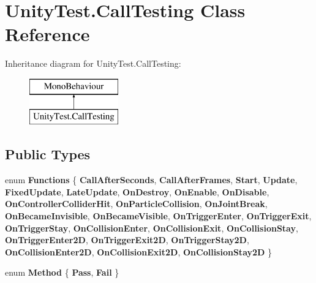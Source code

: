 \hypertarget{class_unity_test_1_1_call_testing}{}\section{Unity\+Test.\+Call\+Testing Class Reference}
\label{class_unity_test_1_1_call_testing}
Inheritance diagram for Unity\+Test.\+Call\+Testing\+:\begin{figure}[H]
\begin{center}
\leavevmode
\includegraphics[height=2.000000cm]{class_unity_test_1_1_call_testing}
\end{center}
\end{figure}
\subsection*{Public Types}
\begin{DoxyCompactItemize}
\item 
\mbox{\label{class_unity_test_1_1_call_testing_a1c1694c213a914a7e637981071285f58}} 
enum {\bfseries Functions} \{ \newline
{\bfseries Call\+After\+Seconds}, 
{\bfseries Call\+After\+Frames}, 
{\bfseries Start}, 
{\bfseries Update}, 
\newline
{\bfseries Fixed\+Update}, 
{\bfseries Late\+Update}, 
{\bfseries On\+Destroy}, 
{\bfseries On\+Enable}, 
\newline
{\bfseries On\+Disable}, 
{\bfseries On\+Controller\+Collider\+Hit}, 
{\bfseries On\+Particle\+Collision}, 
{\bfseries On\+Joint\+Break}, 
\newline
{\bfseries On\+Became\+Invisible}, 
{\bfseries On\+Became\+Visible}, 
{\bfseries On\+Trigger\+Enter}, 
{\bfseries On\+Trigger\+Exit}, 
\newline
{\bfseries On\+Trigger\+Stay}, 
{\bfseries On\+Collision\+Enter}, 
{\bfseries On\+Collision\+Exit}, 
{\bfseries On\+Collision\+Stay}, 
\newline
{\bfseries On\+Trigger\+Enter2D}, 
{\bfseries On\+Trigger\+Exit2D}, 
{\bfseries On\+Trigger\+Stay2D}, 
{\bfseries On\+Collision\+Enter2D}, 
\newline
{\bfseries On\+Collision\+Exit2D}, 
{\bfseries On\+Collision\+Stay2D}
 \}
\item 
\mbox{\label{class_unity_test_1_1_call_testing_a0be2853f5455848e8161ae59ffc61326}} 
enum {\bfseries Method} \{ {\bfseries Pass}, 
{\bfseries Fail}
 \}
\end{DoxyCompactItemize}
